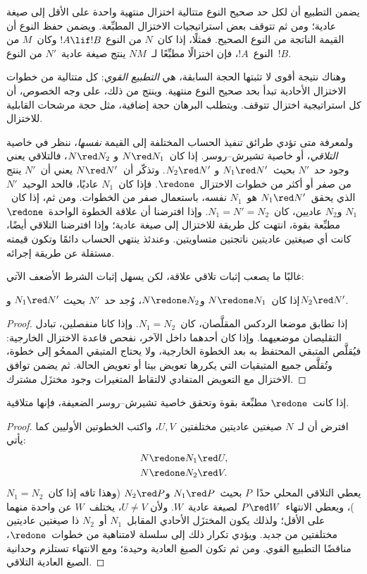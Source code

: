\documentclass[../../../include/open-logic-section]{subfiles}
\begin{document}
يضمن التطبيع أن لكل حد صحيح النوع متتالية اختزال منتهية واحدة على الأقل إلى
صيغة عادية؛ ومن ثم تتوقف بعض استراتيجيات الاختزال المطبِّعة. ويضمن حفظ النوع
أن القيمة الناتجة من النوع الصحيح. فمثلًا، إذا كان~$N$ من النوع
$!A\lif !B$ وكان~$M$ من النوع~$!A$، فإن اختزالًا مطبِّعًا لـ~$NM$ ينتج
صيغة عادية~$N'$ من النوع~$!B$.

وهناك نتيجة أقوى لا تثبتها الحجة السابقة، هي \emph{التطبيع القوي}: كل
متتالية من خطوات الاختزال الأحادية تبدأ بحد صحيح النوع منتهية. وينتج من ذلك،
على وجه الخصوص، أن كل استراتيجية اختزال تتوقف. ويتطلب البرهان حجة إضافية،
مثل حجة مرشحات القابلية للاختزال.

ولمعرفة متى تؤدي طرائق تنفيذ الحساب المختلفة إلى القيمة \emph{نفسها}، ننظر
في خاصية \emph{التلاقي}، أو خاصية تشيرش--روسر. إذا كان~$N\red N_1$ و
$N\red N_2$، فالتلاقي يعني وجود حد~$N'$ بحيث~$N_1\red N'$ و
$N_2\red N'$. وتذكّر أن~$N\red N'$ يعني أن~$N'$ ينتج من صفر أو أكثر من
خطوات الاختزال~$\redone$. فإذا كان~$N_1$ عاديًا، فالحد الوحيد~$N'$ الذي
يحقق~$N_1\red N'$ هو~$N_1$ نفسه، باستعمال صفر من الخطوات. ومن ثم، إذا
كان~$N_1$ و$N_2$ عاديين، كان~$N_1=N'=N_2$. وإذا افترضنا أن علاقة الخطوة
الواحدة~$\redone$ مطبِّعة بقوة، انتهت كل طريقة للاختزال إلى صيغة عادية؛
وإذا افترضنا التلاقي أيضًا، كانت أي صيغتين عاديتين ناتجتين متساويتين. وعندئذ
ينتهي الحساب دائمًا وتكون قيمته مستقلة عن طريقة إجرائه.

غالبًا ما يصعب إثبات تلاقي علاقة، لكن يسهل إثبات الشرط الأضعف الآتي:

\begin{prop}
إذا كان~$N\redone N_1$ و$N\redone N_2$، وُجد حد~$N'$ بحيث
$N_1\red N'$ و$N_2\red N'$.
\end{prop}

\begin{proof}
  إذا تطابق موضعا الردكس المقلَّصان، كان~$N_1=N_2$. وإذا كانا منفصلين،
  تبادل التقليصان موضعيهما. وإذا كان أحدهما داخل الآخر، نفحص قاعدة الاختزال
  الخارجية: فيُقلَّص المتبقي المحتفظ به بعد الخطوة الخارجية، ولا يحتاج
  المتبقي الممحُو إلى خطوة، وتُقلَّص جميع المتبقيات التي يكررها تعويض بيتا أو
  تعويض الحالة. ثم يضمن توافق الاختزال مع التعويض المتفادي لالتقاط المتغيرات
  وجود مختزَل مشترك.
\end{proof}

\begin{lem}
إذا كانت~$\redone$ مطبِّعة بقوة وتحقق خاصية تشيرش--روسر الضعيفة، فإنها
متلاقية.
\end{lem}

\begin{proof}
  افترض أن لـ~$N$ صيغتين عاديتين مختلفتين~$U,V$، واكتب الخطوتين الأوليين
  كما يأتي:
  \begin{align*}
    N &\redone N_1\red U,\\
    N &\redone N_2\red V.
  \end{align*}
  يعطي التلاقي المحلي حدًا~$P$ بحيث~$N_1\red P$ و$N_2\red P$ (وهذا تافه
  إذا كان~$N_1=N_2$)، ويعطي الانتهاء~$P\red W$ لصيغة عادية~$W$. ولأن
  $U\ne V$، يختلف~$W$ عن واحدة منهما على الأقل؛ ولذلك يكون المختزَل الأحادي
  المقابل~$N_1$ أو~$N_2$ ذا صيغتين عاديتين مختلفتين من جديد. ويؤدي تكرار
  ذلك إلى سلسلة لامتناهية من خطوات~$\redone$، مناقضًا التطبيع القوي. ومن ثم
  تكون الصيغ العادية وحيدة؛ ومع الانتهاء تستلزم وحدانية الصيغ العادية
  التلاقي.
\end{proof}
\end{document}
